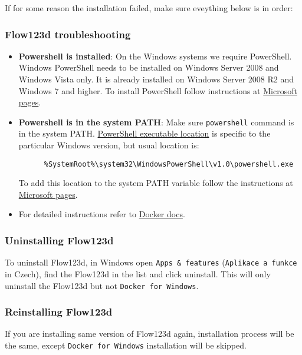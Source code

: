 If for some reason the installation failed, make sure eveything below is in order:


\subsubsection{Flow123d troubleshooting}

\begin{itemize}
  \item \textbf{Powershell is installed}: On the Windows systems we require PowerShell. Windows PowerShell needs to be installed on Windows Server 2008 and Windows Vista only.
  It is already installed on Windows Server 2008 R2 and Windows 7 and higher. To install PowerShell follow instructions at
  \href{https://msdn.microsoft.com/en-us/powershell/scripting/setup/installing-windows-powershell}{Microsoft pages}.

  \item \textbf{Powershell is in the system PATH}: Make sure \verb'powershell' command is in the system PATH.
  \href{http://www.powershelladmin.com/wiki/PowerShell_Executables_File_System_Locations}{PowerShell executable location}
   is specific to the particular Windows version, but usual location is:
   \begin{verbatim}
      %SystemRoot%\system32\WindowsPowerShell\v1.0\powershell.exe
   \end{verbatim}
   To add this location to the system PATH variable follow the instructions at
   \href{https://msdn.microsoft.com/en-us/library/office/ee537574(v=office.14).aspx}{Microsoft pages}.

   \item For detailed instructions refer to \href{https://docs.docker.com/docker-for-windows/}{Docker docs}.
\end{itemize}


\subsubsection{Uninstalling Flow123d}
To uninstall Flow123d, in Windows open \verb'Apps & features' (\verb'Aplikace a funkce' in Czech), find the Flow123d in the list
and click uninstall. This will only uninstall the Flow123d but not \verb'Docker for Windows'.


\subsubsection{Reinstalling Flow123d}
\label{duplicit-image}
If you are installing same version of Flow123d again, installation process will be the same,
except \verb'Docker for Windows' installation will be skipped.


